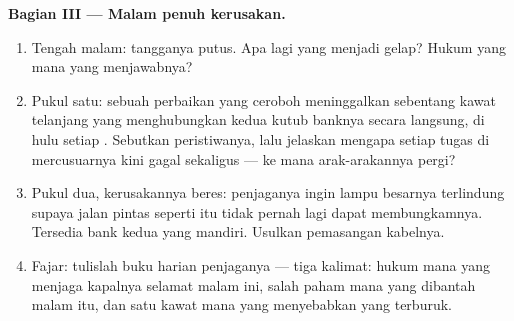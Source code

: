 \begin{problem}
\medskip\noindent\textbf{Bagian III --- Malam penuh kerusakan.}
\begin{enumerate}[resume]
  \item Tengah malam:  tangganya putus. Apa lagi yang menjadi
        gelap? Hukum yang mana yang menjawabnya?
  \item Pukul satu: sebuah perbaikan yang ceroboh meninggalkan
        sebentang kawat telanjang yang menghubungkan kedua kutub
        banknya secara langsung, di hulu setiap . Sebutkan
        peristiwanya, lalu jelaskan mengapa setiap tugas di
        mercusuarnya kini gagal sekaligus --- ke mana arak-arakannya
        pergi?
  \item Pukul dua, kerusakannya beres: penjaganya ingin lampu
        besarnya terlindung supaya jalan pintas seperti itu tidak
        pernah lagi dapat membungkamnya. Tersedia bank  kedua
        yang mandiri. Usulkan pemasangan kabelnya.
  \item Fajar: tulislah buku harian penjaganya --- tiga kalimat:
        hukum mana yang menjaga kapalnya selamat malam ini, salah
        paham mana yang dibantah malam itu, dan satu kawat mana yang
        menyebabkan  yang terburuk.
\end{enumerate}
\end{problem}

